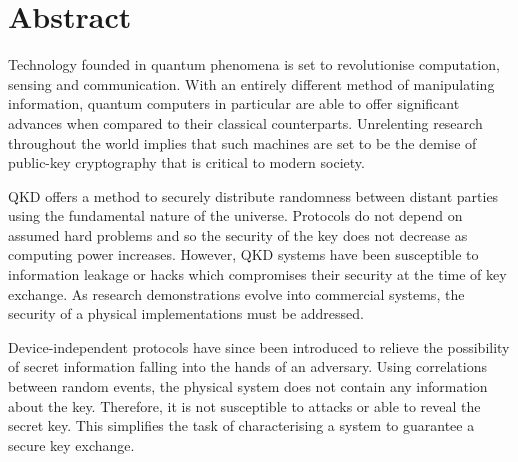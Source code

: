 %
%
%



\chapter*{Abstract}


Technology founded in quantum phenomena is set to revolutionise computation, sensing and communication. With an entirely different method of manipulating information, quantum computers in particular are able to offer significant advances when compared to their classical counterparts. Unrelenting research throughout the world implies that such machines are set to be the demise of public-key cryptography that is critical to modern society.

\Ac{QKD} offers a method to securely distribute randomness between distant parties using the fundamental nature of the universe. Protocols do not depend on assumed hard problems and so the security of the key does not decrease as computing power increases. However, \ac{QKD} systems have been susceptible to information leakage or hacks which compromises their security at the time of key exchange. As research demonstrations evolve into commercial systems, the security of a physical implementations must be addressed. 


Device-independent protocols have since been introduced to relieve the possibility of secret information falling into the hands of an adversary. Using correlations between random events, the physical system does not contain any information about the key. Therefore, it is not susceptible to attacks or able to reveal the secret key. This simplifies the task of characterising a system to guarantee a secure key exchange.

